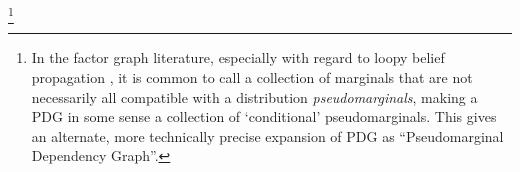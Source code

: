 \documentclass{article}
\theoremstyle{plain}
\theoremstyle{definition}
\theoremstyle{remark}
\newcommand{\moveme}[1]{{\color{purple}\ \!\Large\smash{\textbf{[}}{\normalsize\textsc{moveme:} #1}\ \!\smash{\textbf{]}}}}
\newcommand{\commentout}[1]{\ignorespaces}
\newcommand{\vfullfootnote}[1]{}
\renewcommand{\vfullfootnote}[1]{\footnote{#1}}
\newcommand{\MN}{PDG}
\newcommand{\MNs}{\MN s}
\numberwithin{equation}{section}
\begin{document}
	\vfullfootnote{In the factor graph literature,
                  especially with regard to loopy belief propagation
                  \cite{wainwright2007graphical}, it is common to
                  call a collection of marginals that are not
                  necessarily all compatible with a distribution
                  \emph{pseudomarginals}, making a PDG in some sense a
                  collection of `conditional' pseudomarginals. This
                  gives an alternate, more technically precise
                  expansion of PDG as ``Pseudomarginal Dependency
                  Graph''.} 

	\commentout{Compared to a Bayesian Network, a PDG still consists of a directed graph, and the edges still inform conditional probabilities, but now each edge is interpreted individually. Consider the graph
	\[ A \!\rightarrow\! C \!\leftarrow\! B,\]
	which would be interpreted as three tables $\Pr(C\mid A, B), \Pr(A), \Pr(B)$ in a BN. Interpreting it as a \MNs, there are no distributions on $A$ or $B$, and the arrows into $C$ would be split into two separate tables $\Pr(C \mid A)$ and $\Pr(B \mid A)$, rather than a joint one. }
\end{document}
